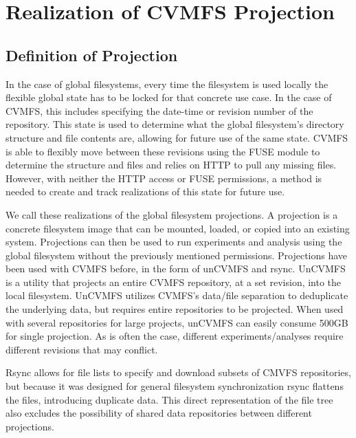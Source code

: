 \documentclass[sigconf]{acmart}
\begin{document}
\section{Realization of CVMFS Projection}

\subsection{Definition of Projection}

In the case of global filesystems,
every time the filesystem is used locally
the flexible global state has to be 
locked for that concrete use case.
In the case of CVMFS,
this includes specifying the date-time
or revision number of the repository.
This state is used to determine 
what the global filesystem's directory
structure and file contents are, 
allowing for future use of the same state.
CVMFS is able to flexibly move
between these revisions using the FUSE module
to determine the structure and files and
relies on HTTP to pull any missing files.
However, with neither the HTTP access or
FUSE permissions, a method is needed to 
create and track realizations of this
state for future use.

We call these realizations of the global filesystem
projections.
A projection is a concrete filesystem image that can be
mounted, loaded, or copied into an existing system.
Projections can then be used to run experiments
and analysis using the global filesystem without
the previously mentioned permissions.
Projections have been used with CVMFS before,
in the form of unCVMFS and rsync.
UnCVMFS is a utility that projects an entire
CVMFS repository, at a set revision, into the local
filesystem. 
UnCVMFS utilizes CVMFS's data/file separation
to deduplicate the underlying data, but requires
entire repositories to be projected.
When used with several repositories for large projects,
unCVMFS can easily consume 500GB for single projection.
As is often the case, different experiments/analyses 
require different revisions that may conflict.

Rsync allows for file lists to specify and download
subsets of CMVFS repositories, but because it
was designed for general filesystem synchronization
rsync flattens the files, introducing duplicate data.
This direct representation of the file tree also
excludes the possibility of shared data repositories
between different projections.

\end{document}

